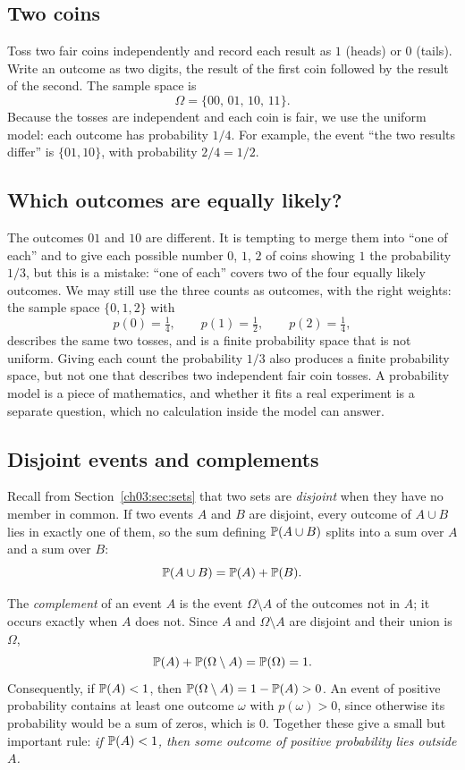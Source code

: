 \subsection*{Two coins}
Toss two fair coins independently and record each result as $1$ (heads) or $0$ (tails). Write an outcome as two digits, the result of the first coin followed by the result of the second. The sample space is
\[
\Omega=\{00,\,01,\,10,\,11\}.
\]
Because the tosses are independent and each coin is fair, we use the uniform model: each outcome has probability $1/4$. For example, the event ``the two results differ'' is $\{01,10\}$, with probability $2/4=1/2$.

\subsection*{Which outcomes are equally likely?}
The outcomes $01$ and $10$ are different. It is tempting to merge them into ``one of each'' and to give each possible number $0$, $1$, $2$ of coins showing $1$ the probability $1/3$, but this is a mistake: ``one of each'' covers two of the four equally likely outcomes. We may still use the three counts as outcomes, with the right weights: the sample space $\{0,1,2\}$ with
\[
p(0)=\tfrac14,\qquad p(1)=\tfrac12,\qquad p(2)=\tfrac14,
\]
describes the same two tosses, and is a finite probability space that is not uniform. Giving each count the probability $1/3$ also produces a finite probability space, but not one that describes two independent fair coin tosses. A probability model is a piece of mathematics, and whether it fits a real experiment is a separate question, which no calculation inside the model can answer.

\subsection*{Disjoint events and complements}
Recall from Section~\ref{ch03:sec:sets} that two sets are \emph{disjoint} when they have no member in common. If two events $A$ and $B$ are disjoint, every outcome of $A\cup B$ lies in exactly one of them, so the sum defining $\operatorname{\mathbb P}(A\cup B)$ splits into a sum over $A$ and a sum over $B$:
\[
\operatorname{\mathbb P}(A\cup B)=\operatorname{\mathbb P}(A)+\operatorname{\mathbb P}(B).
\]

The \emph{complement} of an event $A$ is the event $\Omega\setminus A$ of the outcomes not in $A$; it occurs exactly when $A$ does not. Since $A$ and $\Omega\setminus A$ are disjoint and their union is $\Omega$,
\[
\operatorname{\mathbb P}(A)+\operatorname{\mathbb P}(\Omega\setminus A)=\operatorname{\mathbb P}(\Omega)=1.
\]
Consequently, if $\operatorname{\mathbb P}(A)<1$, then $\operatorname{\mathbb P}(\Omega\setminus A)=1-\operatorname{\mathbb P}(A)>0$. An event of positive probability contains at least one outcome $\omega$ with $p(\omega)>0$, since otherwise its probability would be a sum of zeros, which is $0$. Together these give a small but important rule: \emph{if $\operatorname{\mathbb P}(A)<1$, then some outcome of positive probability lies outside $A$.}

